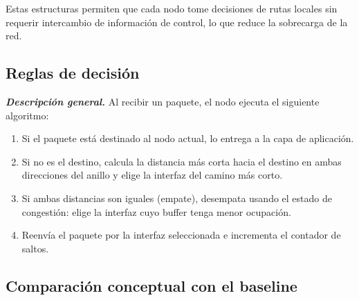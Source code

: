 \documentclass[10pt,letterpaper,twocolumn]{article}
\newcommand{\coltablesetup}{%
  \scriptsize
  \setlength{\tabcolsep}{3pt}%
  \renewcommand{\arraystretch}{1.08}%
}
\begin{document}
Estas estructuras permiten que cada nodo tome decisiones de rutas locales sin requerir intercambio de información de control, lo que reduce la sobrecarga de la red.

\FloatBarrier

\subsection{Reglas de decisión}

\textbf{\textit{Descripción general.}} Al recibir un paquete, el nodo ejecuta el siguiente algoritmo:

\begin{enumerate}
  \item Si el paquete está destinado al nodo actual, lo entrega a la capa de aplicación.
  \item Si no es el destino, calcula la distancia más corta hacia el destino en ambas direcciones del anillo y elige la interfaz del camino más corto.
  \item Si ambas distancias son iguales (empate), desempata usando el estado de congestión: elige la interfaz cuyo buffer tenga menor ocupación.
  \item Reenvía el paquete por la interfaz seleccionada e incrementa el contador de saltos.
\end{enumerate}

\FloatBarrier

\subsection{Comparación conceptual con el baseline}

\begin{table}[!ht]
  \centering
  \caption{Comparación conceptual: baseline vs.\ propuesto.}
  \label{tab:concepto}
  \coltablesetup
\end{table}
\end{document}
